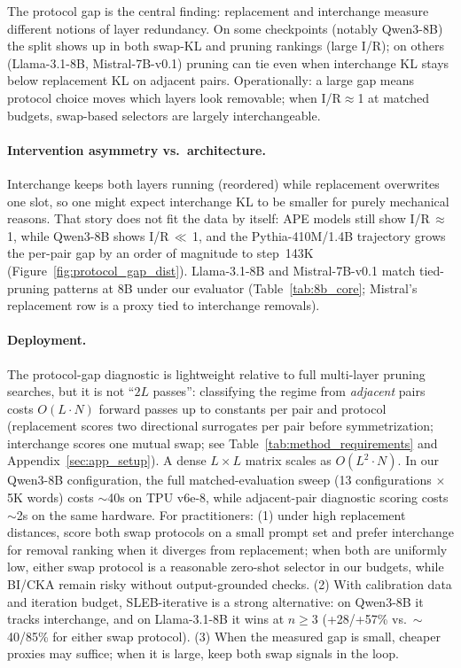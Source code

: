 \documentclass{article}
\begin{document}
The protocol gap is the central finding: replacement and interchange measure different notions of layer redundancy. On some checkpoints (notably Qwen3-8B) the split shows up in both swap-KL and pruning rankings (large I/R); on others (Llama-3.1-8B, Mistral-7B-v0.1) pruning can tie even when interchange KL stays below replacement KL on adjacent pairs. Operationally: a large gap means protocol choice moves which layers look removable; when I/R$\approx$1 at matched budgets, swap-based selectors are largely interchangeable.

\paragraph{Intervention asymmetry vs.\ architecture.}
Interchange keeps both layers running (reordered) while replacement overwrites one slot, so one might expect interchange KL to be smaller for purely mechanical reasons. That story does not fit the data by itself: APE models still show I/R\,$\approx$\,1, while Qwen3-8B shows I/R\,$\ll$\,1, and the Pythia-410M/1.4B trajectory grows the per-pair gap by an order of magnitude to step~143K (Figure~\ref{fig:protocol_gap_dist}). Llama-3.1-8B and Mistral-7B-v0.1 match tied-pruning patterns at 8B under our evaluator (Table~\ref{tab:8b_core}; Mistral's replacement row is a proxy tied to interchange removals).

\paragraph{Deployment.}
The protocol-gap diagnostic is lightweight relative to full multi-layer pruning searches, but it is not ``$2L$ passes'': classifying the regime from \emph{adjacent} pairs costs $O(L \cdot N)$ forward passes up to constants per pair and protocol (replacement scores two directional surrogates per pair before symmetrization; interchange scores one mutual swap; see Table~\ref{tab:method_requirements} and Appendix~\ref{sec:app_setup}). A dense $L {\times} L$ matrix scales as $O(L^2 \cdot N)$. In our Qwen3-8B configuration, the full matched-evaluation sweep (13 configurations $\times$ 5K words) costs $\sim$40s on TPU v6e-8, while adjacent-pair diagnostic scoring costs $\sim$2s on the same hardware.
For practitioners: (1) under high replacement distances, score both swap protocols on a small prompt set and prefer interchange for removal ranking when it diverges from replacement; when both are uniformly low, either swap protocol is a reasonable zero-shot selector in our budgets, while BI/CKA remain risky without output-grounded checks. (2) With calibration data and iteration budget, SLEB-iterative is a strong alternative: on Qwen3-8B it tracks interchange, and on Llama-3.1-8B it wins at $n{\geq}3$ (+28/+57\% vs.\ ${\sim}$40/85\% for either swap protocol). (3) When the measured gap is small, cheaper proxies may suffice; when it is large, keep both swap signals in the loop.
\end{document}
